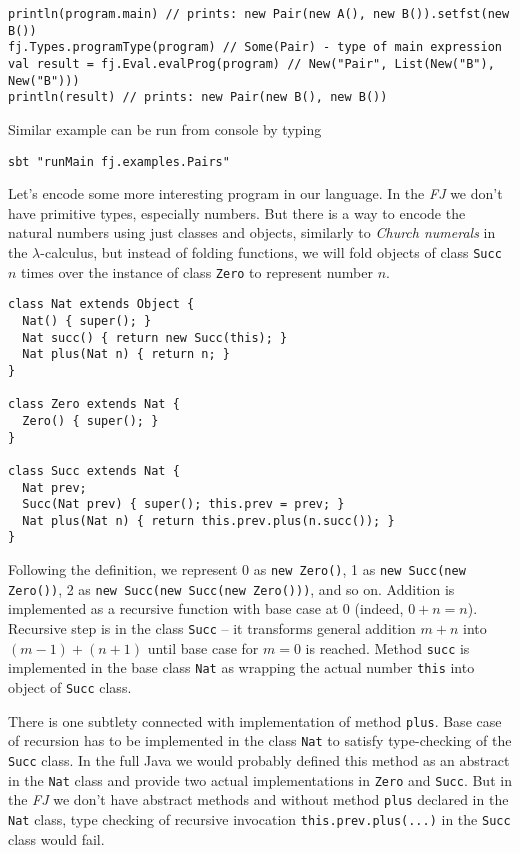 \documentclass{article}[12pt]
\begin{document}
\begin{verbatim}
println(program.main) // prints: new Pair(new A(), new B()).setfst(new B())
fj.Types.programType(program) // Some(Pair) - type of main expression
val result = fj.Eval.evalProg(program) // New("Pair", List(New("B"), New("B")))
println(result) // prints: new Pair(new B(), new B())
\end{verbatim}
Similar example can be run from console by typing

\begin{verbatim}
sbt "runMain fj.examples.Pairs"
\end{verbatim}

Let's encode some more interesting program in our language. In
the \emph{FJ} we don't have primitive types, especially numbers.
But there is a way to encode the natural numbers using just classes
and objects, similarly to \emph{Church numerals} in
the $\lambda$-calculus, but instead of folding functions, we
will fold objects of class \texttt{Succ} $n$ times over the
instance of class \texttt{Zero} to represent number $n$.

\begin{verbatim}
class Nat extends Object {
  Nat() { super(); }
  Nat succ() { return new Succ(this); }
  Nat plus(Nat n) { return n; }
}

class Zero extends Nat { 
  Zero() { super(); }
}

class Succ extends Nat {
  Nat prev;
  Succ(Nat prev) { super(); this.prev = prev; }
  Nat plus(Nat n) { return this.prev.plus(n.succ()); }
}
\end{verbatim}

Following the definition, we represent 0 as \texttt{new Zero()},
1 as \texttt{new Succ(new Zero())},
2 as \texttt{new Succ(new Succ(new Zero()))}, and so on.
Addition is implemented as a recursive function with base case
at 0 (indeed, $0 + n = n$). Recursive step is in the class
\texttt{Succ} -- it transforms general addition $m + n$ into
$(m-1) + (n+1)$ until base case for $m = 0$ is reached.
Method \texttt{succ} is implemented in the base class
\texttt{Nat} as wrapping the actual number \texttt{this}
into object of \texttt{Succ} class.

There is one subtlety connected with implementation of method
\texttt{plus}. Base case of recursion has to be implemented in
the class \texttt{Nat} to satisfy type-checking of the
\texttt{Succ} class. In the full Java we would probably
defined this method as an abstract in the \texttt{Nat} class
and provide two actual implementations in \texttt{Zero} and 
\texttt{Succ}. But in the \emph{FJ} we don't have abstract
methods and without method \texttt{plus} declared in
the \texttt{Nat} class, type checking of recursive invocation 
\texttt{this.prev.plus(...)} in the \texttt{Succ} class
would fail.
\end{document}
